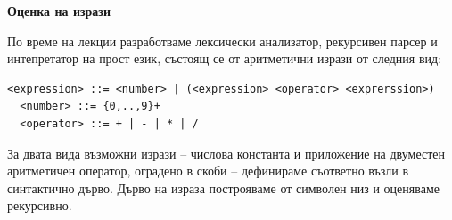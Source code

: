 \begin{mdframed}[hidealllines=true,backgroundcolor=gray!20]
\textbf{Оценка на изрази}


По време на лекции разработваме лексически анализатор, рекурсивен парсер и интепретатор на прост език, състоящ се от аритметични изрази от следния вид:
\begin{flushleft}
  \begin{lstlisting}[mathescape]
  <expression> ::= <number> | (<expression> <operator> <exprerssion>)
  <number> ::= {0,..,9}+
  <operator> ::= + | - | * | /
  \end{lstlisting}
\end{flushleft}

За двата вида възможни изрази -- числова константа и приложение на двуместен аритметичен оператор, оградено в скоби -- дефинираме съответно възли в синтактично дърво. Дърво на израза построяваме от символен низ и оценяваме рекурсивно.

\end{mdframed}


